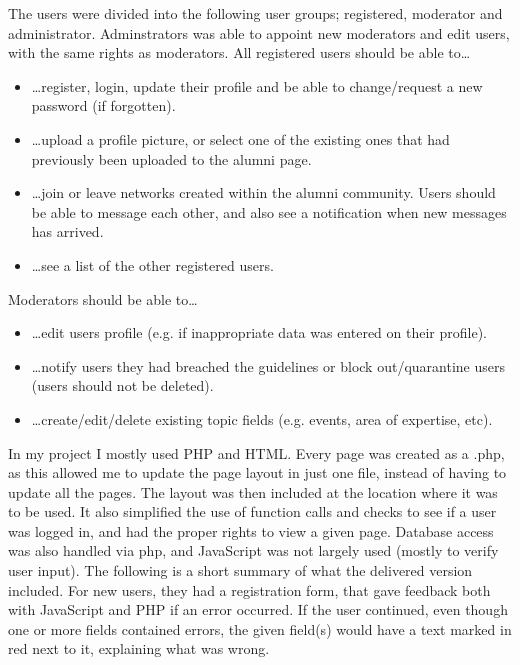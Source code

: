 The users were divided into the following user groups; registered, moderator and administrator. 
Adminstrators was able to appoint new moderators and edit users, with the same rights as moderators.
\vspace{0.5em}\newline	
All registered users should be able to\ldots
\begin{itemize}
	\item \ldots register, login, update their profile and be able to change/request a new password (if	forgotten).
	\item \ldots upload a profile picture, or select one of the existing ones that had previously been uploaded to the alumni page.
	\item \ldots join or leave networks created within the alumni community. Users should be able to message each other, and also see a notification when new messages has arrived.
	\item \ldots see a list of the other registered users.
\end{itemize}
Moderators should be able to\ldots
\begin{itemize}
	\item \ldots edit users profile (e.g. if inappropriate data was entered on their profile).
	\item \ldots notify users they had breached the guidelines or block out/quarantine users (users should not be deleted).
	\item \ldots create/edit/delete existing topic fields (e.g. events, area of expertise, etc).
\end{itemize}
In my project I mostly used PHP and HTML. 
Every page was created as a .php, as this allowed me to update the page layout in just one file, instead of having to update all the pages. 
The layout was then included at the location where it was to be used. 
It also simplified the use of function calls and checks to see if a user was logged in, and had the proper rights to view a given page. 
Database access was also handled via php, and JavaScript was not largely used (mostly to verify user input).
\vspace{0.5em}\newline
The following is a short summary of what the delivered version included. 
For new users, they had a registration form, that gave feedback both with JavaScript and PHP if an error occurred. 
If the user continued, even though one or more fields contained errors, the given field(s) would have a text marked in red next to it, explaining what was wrong. 
